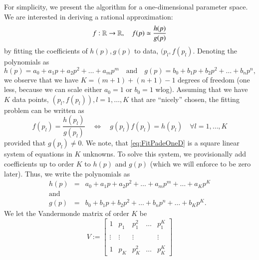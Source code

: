 For simplicity, we present the algorithm for a one-dimensional parameter space. We are interested in deriving a rational approximation:
\begin{equation}\label{eq:PadeOneD}
  f : \mathbb{R} \rightarrow \mathbb{R}, \quad f(p) \simeq \frac{h(p)}{g(p)}
\end{equation}
by fitting the coefficients of $h(p), g(p)$ to data, $(p_l, f(p_l)$. Denoting the polynomials
as
\begin{equation}
  h(p) = a_0 + a_1 p + a_2 p^2 + \ldots + a_m p^m \quad \text{and} \quad
  g(p) = b_0 + b_1 p + b_2 p^2 + \ldots + b_n p^n,
\end{equation}
we observe that we have $K=(m+1)+(n+1)-1$ degrees of freedom (one less, because we can scale
either $a_0=1$ or $b_0=1$ wlog). Assuming that we have $K$ data points, $\left(p_l, f(p_l)\right), l=1,\ldots,K$
that are ``nicely'' chosen, the fitting problem can be written as
\begin{equation}\label{eq:FitPadeOneD}
  f(p_l) =  \frac{h(p_l)}{g(p_l)} \quad \Leftrightarrow \quad g(p_l)f(p_l) =  h(p_l) \quad \forall l=1,\ldots,K
\end{equation}
provided that $g(p_l) \not = 0$. We note, that \eqref{eq:FitPadeOneD} is a square linear
system of equations in $K$ unknowns. To solve this system, we provisionally add coefficients
up to order $K$ to $h(p)$ and $g(p)$ (which we will enforce to be zero later). Thus, we write
the polynomials as
\begin{equation}
  \begin{array}{rcl}
    h(p) & = & a_0 + a_1 p + a_2 p^2 + \ldots + a_m p^m + \ldots + a_K p^K \\
    \text{and} & & \\
    g(p) & = & b_0 + b_1 p + b_2 p^2 + \ldots + b_n p^n + \ldots + b_K p^K.
  \end{array}
\end{equation}
We let the Vandermonde matrix of order $K$ be
\begin{equation}
  V := \left[ \begin{array}{ccccc}
      1 & p_1 & p_1^2 & \ldots & p_1^K \\
        &     &      &        &       \\
      \vdots & \vdots & \vdots &   & \vdots \\
        &     &      &        &       \\
      1 & p_K & p_K^2 & \ldots & p_K^K 
       \end{array}\right]
\end{equation}
